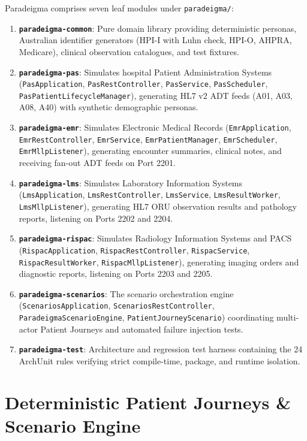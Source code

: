 Paradeigma comprises seven leaf modules under \nolinkurl{paradeigma/}:
\begin{enumerate}
    \item \textbf{\texttt{paradeigma-common}}: Pure domain library providing deterministic personas, Australian identifier generators (HPI-I with Luhn check, HPI-O, AHPRA, Medicare), clinical observation catalogues, and test fixtures.
    \item \textbf{\texttt{paradeigma-pas}}: Simulates hospital Patient Administration Systems (\nolinkurl{PasApplication}, \nolinkurl{PasRestController}, \nolinkurl{PasService}, \nolinkurl{PasScheduler}, \nolinkurl{PasPatientLifecycleManager}), generating HL7 v2 ADT feeds (A01, A03, A08, A40) with synthetic demographic personas.
    \item \textbf{\texttt{paradeigma-emr}}: Simulates Electronic Medical Records (\nolinkurl{EmrApplication}, \nolinkurl{EmrRestController}, \nolinkurl{EmrService}, \nolinkurl{EmrPatientManager}, \nolinkurl{EmrScheduler}, \nolinkurl{EmrMllpListener}), generating encounter summaries, clinical notes, and receiving fan-out ADT feeds on Port 2201.
    \item \textbf{\texttt{paradeigma-lms}}: Simulates Laboratory Information Systems (\nolinkurl{LmsApplication}, \nolinkurl{LmsRestController}, \nolinkurl{LmsService}, \nolinkurl{LmsResultWorker}, \nolinkurl{LmsMllpListener}), generating HL7 ORU observation results and pathology reports, listening on Ports 2202 and 2204.
    \item \textbf{\texttt{paradeigma-rispac}}: Simulates Radiology Information Systems and PACS (\nolinkurl{RispacApplication}, \nolinkurl{RispacRestController}, \nolinkurl{RispacService}, \nolinkurl{RispacResultWorker}, \nolinkurl{RispacMllpListener}), generating imaging orders and diagnostic reports, listening on Ports 2203 and 2205.
    \item \textbf{\texttt{paradeigma-scenarios}}: The scenario orchestration engine (\nolinkurl{ScenariosApplication}, \nolinkurl{ScenariosRestController}, \nolinkurl{ParadeigmaScenarioEngine}, \nolinkurl{PatientJourneyScenario}) coordinating multi-actor Patient Journeys and automated failure injection tests.
    \item \textbf{\texttt{paradeigma-test}}: Architecture and regression test harness containing the 24 ArchUnit rules verifying strict compile-time, package, and runtime isolation.
\end{enumerate}

\section{Deterministic Patient Journeys \& Scenario Engine}


